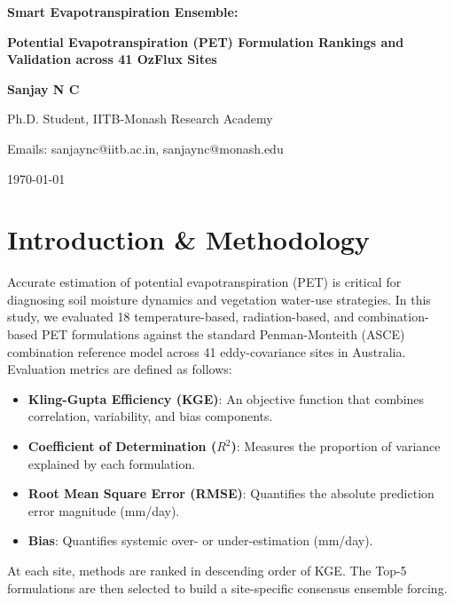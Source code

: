 \documentclass[11pt,a4paper]{article}
\begin{document}
\begin{titlepage}
\centering
\vspace*{2cm}
{\Huge\bfseries Smart Evapotranspiration Ensemble:\par}
\vspace{0.5cm}
{\Large\bfseries Potential Evapotranspiration (PET) Formulation Rankings and Validation across 41 OzFlux Sites\par}
\vspace{1.5cm}
{\large\bfseries Sanjay N C\par}
{\large Ph.D. Student, IITB-Monash Research Academy\par}
{\large Emails: sanjaync@iitb.ac.in, sanjaync@monash.edu\par}
\vspace{1cm}
{\large\today\par}
\vspace{2cm}
\begin{abstract}
This report presents a comprehensive cross-validation of 18 different potential evapotranspiration (PET) formulations against the Penman-Monteith ASCE combination reference benchmark across 41 OzFlux eddy-covariance sites. Evaluation metrics including the Kling-Gupta Efficiency (KGE), coefficient of determination ($R^2$), root mean square error (RMSE), and bias are compiled programmatically to rank methods and select the Top-5 best performing formulations for each site. The results serve as a calibration foundation for the Stochastic Soil Water Model (SSWM) and Eco-Evolutionary Optimality (EEO) pipelines across Australian ecosystems.
\end{abstract}
\end{titlepage}
\tableofcontents
\newpage
\section{Introduction \& Methodology}
Accurate estimation of potential evapotranspiration (PET) is critical for diagnosing soil moisture dynamics and vegetation water-use strategies. In this study, we evaluated 18 temperature-based, radiation-based, and combination-based PET formulations against the standard Penman-Monteith (ASCE) combination reference model across 41 eddy-covariance sites in Australia. Evaluation metrics are defined as follows:
\begin{itemize}
\item \textbf{Kling-Gupta Efficiency (KGE)}: An objective function that combines correlation, variability, and bias components.
\item \textbf{Coefficient of Determination ($R^2$)}: Measures the proportion of variance explained by each formulation.
\item \textbf{Root Mean Square Error (RMSE)}: Quantifies the absolute prediction error magnitude (mm/day).
\item \textbf{Bias}: Quantifies systemic over- or under-estimation (mm/day).
\end{itemize}
At each site, methods are ranked in descending order of KGE. The Top-5 formulations are then selected to build a site-specific consensus ensemble forcing.
\end{document}
